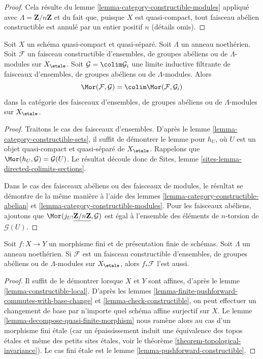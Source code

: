 \begin{proof}
Cela résulte du lemme \ref{lemma-category-constructible-modules}
appliqué avec $\Lambda = \mathbf{Z}/n\mathbf{Z}$
et du fait que, puisque $X$ est quasi-compact, tout faisceau
abélien constructible est annulé par un entier positif $n$ (détails omis).
\end{proof}

\begin{lemma}
\label{lemma-constructible-is-compact}
Soit $X$ un schéma quasi-compact et quasi-séparé. Soit $\Lambda$ un
anneau noethérien. Soit $\mathcal{F}$ un faisceau constructible d'ensembles, de groupes
abéliens ou de $\Lambda$-modules sur $X_\etale$. Soit
$\mathcal{G} = \colim \mathcal{G}_i$ une limite inductive filtrante de faisceaux
d'ensembles, de groupes abéliens ou de $\Lambda$-modules. Alors
$$
\Mor(\mathcal{F}, \mathcal{G}) = \colim \Mor(\mathcal{F}, \mathcal{G}_i)
$$
dans la catégorie des faisceaux d'ensembles, de groupes abéliens ou de $\Lambda$-modules sur
$X_\etale$.
\end{lemma}

\begin{proof}
Traitons le cas des faisceaux d'ensembles. D'après le lemme \ref{lemma-category-constructible-sets},
il suffit de démontrer le lemme pour $h_U$, où $U$ est un objet quasi-compact
et quasi-séparé de $X_\etale$. Rappelons que
$\Mor(h_U, \mathcal{G}) = \mathcal{G}(U)$. Le résultat
découle donc de Sites, lemme \ref{sites-lemma-directed-colimits-sections}.

\medskip\noindent
Dans le cas des faisceaux abéliens ou des faisceaux de modules, le résultat se démontre
de la même manière à l'aide des
lemmes \ref{lemma-category-constructible-abelian} et
\ref{lemma-category-constructible-modules}.
Pour les faisceaux abéliens, ajoutons que
$\Mor(j_{U!}\underline{\mathbf{Z}/n\mathbf{Z}}, \mathcal{G})$
est égal à l'ensemble des éléments de $n$-torsion de $\mathcal{G}(U)$.
\end{proof}

\begin{lemma}
\label{lemma-finite-pushforward-constructible}
Soit $f : X \to Y$ un morphisme fini et de présentation finie de schémas.
Soit $\Lambda$ un anneau noethérien. Si $\mathcal{F}$ est un faisceau constructible
d'ensembles, de groupes abéliens ou de $\Lambda$-modules sur $X_\etale$,
alors $f_*\mathcal{F}$ l'est aussi.
\end{lemma}

\begin{proof}
Il suffit de le démontrer lorsque $X$ et $Y$ sont affines, d'après le
lemme \ref{lemma-constructible-local}.
D'après les
lemmes \ref{lemma-finite-pushforward-commutes-with-base-change} et
\ref{lemma-check-constructible}, on peut effectuer un changement de base par n'importe quel
schéma affine surjectif sur $X$. Le
lemme \ref{lemma-decompose-quasi-finite-morphism}
nous ramène alors au cas d'un morphisme fini \'etale
(car un épaississement induit une équivalence des topos \'etales
et même des petits sites \'etales, voir le
théorème \ref{theorem-topological-invariance}).
Le cas fini \'etale est le
lemme \ref{lemma-pushforward-constructible}.
\end{proof}

